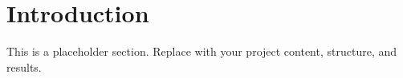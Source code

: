 \section{Introduction}
This is a placeholder section. Replace with your project content, structure, and results.
